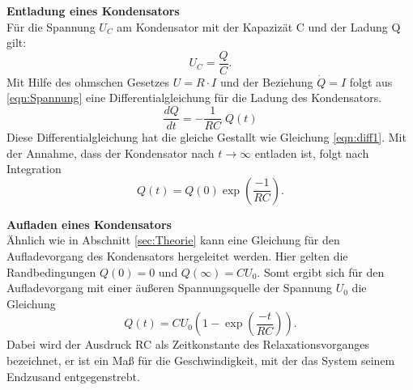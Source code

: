 \textbf{Entladung eines Kondensators}\\
\label{sec:Entladung}
Für die Spannung $U_{C}$ am Kondensator mit der Kapazizät C und der Ladung Q gilt:
\begin{equation}
  U_{C} = \frac{Q}{C}.
  \label{Spannung}
\end{equation}
Mit Hilfe des ohmschen Gesetzes $U=R\cdot I$ und der Beziehung $\dot{Q}=I$
folgt aus \eqref{eqn:Spannung} eine Differentialgleichung für die Ladung des
Kondensators.
\begin{equation}
  \frac{dQ}{dt}=- \frac{1}{RC}\; Q(t)
  \label{eqn:diff2}
\end{equation}
Diese Differentialgleichung hat die gleiche Gestallt wie Gleichung \eqref{eqn:diff1}.
Mit der Annahme, dass der Kondensator nach $t \to \infty$ entladen ist, folgt
nach Integration
\begin{equation}
  Q(t)=Q(0)\exp{(\frac{-1}{RC})}.
  \label{eqn:entladung}
\end{equation}

\textbf{Aufladen eines Kondensators} \\
Ähnlich wie in Abschnitt \ref{sec:Theorie} kann eine Gleichung für den
Aufladevorgang des Kondensators hergeleitet werden. Hier gelten die
Randbedingungen $Q(0)=0$ und $Q(\infty)=CU_{0}$. Somt ergibt sich
für den Aufladevorgang mit einer äußeren Spannungsquelle der Spannung $U_{0}$
die Gleichung
\begin{equation}
  Q(t)=CU_{0}(1-\exp{(\frac{-t}{RC})}).
  \label{aufladen}
\end{equation}
Dabei wird der Ausdruck RC als Zeitkonstante des Relaxationsvorganges bezeichnet,
er ist ein Maß für die Geschwindigkeit, mit der das System seinem Endzusand entgegenstrebt.\\
\\
